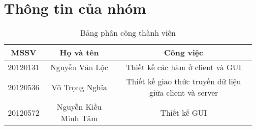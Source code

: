 \section{Thông tin của nhóm}
\begin{table}[H]
\begin{center}
\begin{tabular}{|c|c|c|}
\hline 
MSSV & Họ và tên & Công việc \\ 
\hline 
20120131 & Nguyễn Văn Lộc & Thiết kế các hàm ở client và GUI \\ 
\hline 
20120536 & Võ Trọng Nghĩa & Thiết kế giao thức truyền dữ liệu giữa client và server \\ 
\hline 
20120572 & Nguyễn Kiều Minh Tâm & Thiết kế GUI \\ 
\hline 
\end{tabular}
\caption{Bảng phân công thành viên} 
\end{center}
\end{table}

